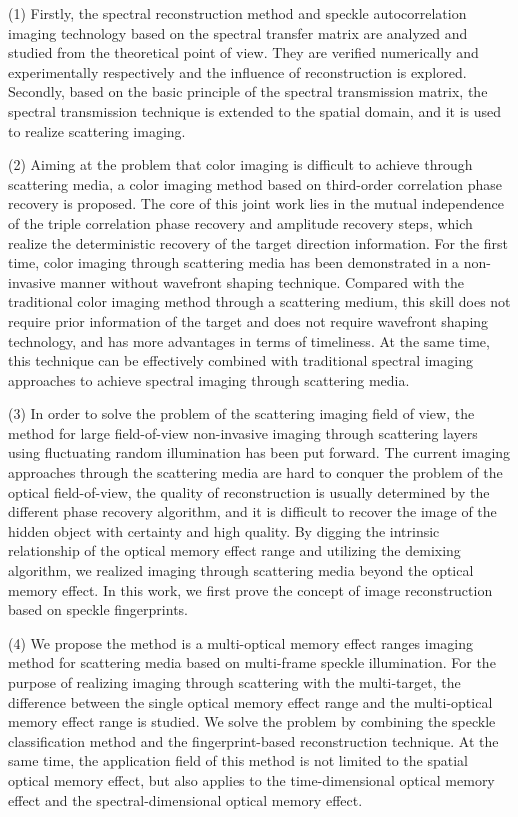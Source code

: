 \begin{englishabstract}
(1) Firstly, the spectral reconstruction method and speckle autocorrelation imaging technology based on the spectral transfer matrix are analyzed and studied from the theoretical point of view. They are verified numerically and experimentally respectively and the influence of reconstruction is explored. Secondly, based on the basic principle of the spectral transmission matrix, the spectral transmission technique is extended to the spatial domain, and it is used to realize scattering imaging.

(2) Aiming at the problem that color imaging is difficult to achieve through scattering media, a color imaging method based on third-order correlation phase recovery is proposed. The core of this joint work lies in the mutual independence of the triple correlation phase recovery and amplitude recovery steps, which realize the deterministic recovery of the target direction information. For the first time, color imaging through scattering media has been demonstrated in a non-invasive manner without wavefront shaping technique. Compared with the traditional color imaging method through a scattering medium, this skill does not require prior information of the target and does not require wavefront shaping technology, and has more advantages in terms of timeliness. At the same time, this technique can be effectively combined with traditional spectral imaging approaches to achieve spectral imaging through scattering media.

(3) In order to solve the problem of the scattering imaging field of view, the method for large field-of-view non-invasive imaging through scattering layers using fluctuating random illumination has been put forward. The current imaging approaches through the scattering media are hard to conquer the problem of the optical field-of-view, the quality of reconstruction is usually determined by the different phase recovery algorithm, and it is difficult to recover the image of the hidden object with certainty and high quality. By digging the intrinsic relationship of the optical memory effect range and utilizing the demixing algorithm, we realized imaging through scattering media beyond the optical memory effect. In this work, we first prove the concept of image reconstruction based on speckle fingerprints.

(4) We propose the method is a multi-optical memory effect ranges imaging method for scattering media based on multi-frame speckle illumination. For the purpose of realizing imaging through scattering with the multi-target, the difference between the single optical memory effect range and the multi-optical memory effect range is studied. We solve the problem by combining the speckle classification method and the fingerprint-based reconstruction technique. At the same time, the application field of this method is not limited to the spatial optical memory effect, but also applies to the time-dimensional optical memory effect and the spectral-dimensional optical memory effect.\\
 \\


\end{englishabstract}
